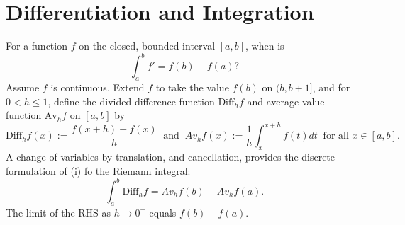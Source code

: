\chapter{Differentiation and Integration}
For a function $f$ on the closed, bounded interval $[a,b]$, when is
\[
    \int_a^bf'=f(b)-f(a)?\tag{i}
\] 
Assume $f$ is continuous.
Extend $f$ to take the value $f(b)$ on $(b,b+1]$, and for $0<h\le1$, define the divided difference function $\text{Diff}_hf$ and average value function $\text{Av}_hf$ on $[a,b]$ by
\[
    \text{Diff}_hf(x):=\frac{f(x+h)-f(x)}{h}\ \text{ and }\ Av_hf(x):=\frac{1}{h}\int_x^{x+h}f(t)dt\ \text{ for all }x\in[a,b].
\]
A change of variables by translation, and cancellation, provides the discrete formulation of (i) fo the Riemann integral:
\[
    \int_a^b\text{Diff}_hf=Av_hf(b)-Av_hf(a).
\]
The limit of the RHS as $h\to0^+$ equals $f(b)-f(a)$.

